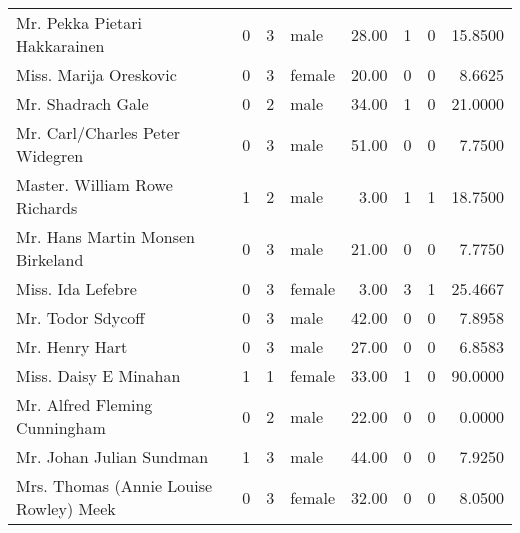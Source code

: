 \begin{tabular}{lrrlrrrr}
Mr. Pekka Pietari Hakkarainen                      &         0 &       3 &    male &  28.00 &                        1 &                        0 &   15.8500 \\
Miss. Marija Oreskovic                             &         0 &       3 &  female &  20.00 &                        0 &                        0 &    8.6625 \\
Mr. Shadrach Gale                                  &         0 &       2 &    male &  34.00 &                        1 &                        0 &   21.0000 \\
Mr. Carl/Charles Peter Widegren                    &         0 &       3 &    male &  51.00 &                        0 &                        0 &    7.7500 \\
Master. William Rowe Richards                      &         1 &       2 &    male &   3.00 &                        1 &                        1 &   18.7500 \\
Mr. Hans Martin Monsen Birkeland                   &         0 &       3 &    male &  21.00 &                        0 &                        0 &    7.7750 \\
Miss. Ida Lefebre                                  &         0 &       3 &  female &   3.00 &                        3 &                        1 &   25.4667 \\
Mr. Todor Sdycoff                                  &         0 &       3 &    male &  42.00 &                        0 &                        0 &    7.8958 \\
Mr. Henry Hart                                     &         0 &       3 &    male &  27.00 &                        0 &                        0 &    6.8583 \\
Miss. Daisy E Minahan                              &         1 &       1 &  female &  33.00 &                        1 &                        0 &   90.0000 \\
Mr. Alfred Fleming Cunningham                      &         0 &       2 &    male &  22.00 &                        0 &                        0 &    0.0000 \\
Mr. Johan Julian Sundman                           &         1 &       3 &    male &  44.00 &                        0 &                        0 &    7.9250 \\
Mrs. Thomas (Annie Louise Rowley) Meek             &         0 &       3 &  female &  32.00 &                        0 &                        0 &    8.0500 \\

\end{tabular}
